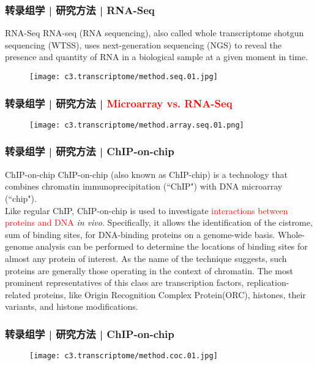 \begin{frame}
  \frametitle{转录组学 | 研究方法 | RNA-Seq}
  {\footnotesize
  \begin{block}{RNA-Seq}
    RNA-seq (RNA sequencing), also called whole transcriptome shotgun sequencing (WTSS), uses next-generation sequencing (NGS) to reveal the presence and quantity of RNA in a biological sample at a given moment in time.
  \end{block}
  }
  \begin{figure}
    \centering
    \texttt{[image: c3.transcriptome/method.seq.01.jpg]}
  \end{figure}
\end{frame}

\begin{frame}
  \frametitle{转录组学 | 研究方法 | \textcolor{red}{Microarray vs. RNA-Seq}}
  \begin{figure}
    \centering
    \texttt{[image: c3.transcriptome/method.array.seq.01.png]}
  \end{figure}
\end{frame}

\begin{frame}
  \frametitle{转录组学 | 研究方法 | ChIP-on-chip}
  \begin{block}{ChIP-on-chip}
    ChIP-on-chip (also known as ChIP-chip) is a technology that combines chromatin immunoprecipitation (``ChIP") with DNA microarray (``chip").\\
    \vspace{1em}
    Like regular ChIP, ChIP-on-chip is used to investigate \textcolor{red}{interactions between proteins and DNA} \textit{in vivo}. Specifically, it allows the identification of the cistrome, sum of binding sites, for DNA-binding proteins on a genome-wide basis. Whole-genome analysis can be performed to determine the locations of binding sites for almost any protein of interest. As the name of the technique suggests, such proteins are generally those operating in the context of chromatin. The most prominent representatives of this class are transcription factors, replication-related proteins, like Origin Recognition Complex Protein(ORC), histones, their variants, and histone modifications.
  \end{block}
\end{frame}

\begin{frame}
  \frametitle{转录组学 | 研究方法 | ChIP-on-chip}
  \begin{figure}
    \centering
    \texttt{[image: c3.transcriptome/method.coc.01.jpg]}
  \end{figure}
\end{frame}


